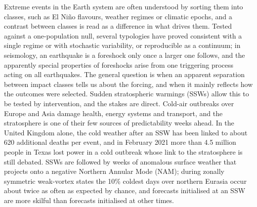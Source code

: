 \documentclass[11pt]{article}
\begin{document}
Extreme events in the Earth system are often understood by sorting them into classes, such as El Niño flavours, weather regimes or climatic epochs, and a contrast between classes is read as a difference in what drives them. Tested against a one-population null, several typologies have proved consistent with a single regime or with stochastic variability\cite{stephenson04,neukom19}, or reproducible as a continuum\cite{thual23}; in seismology, an earthquake is a foreshock only once a larger one follows, and the apparently special properties of foreshocks arise from one triggering process acting on all earthquakes\cite{helmstetter03}. The general question is when an apparent separation between impact classes tells us about the forcing, and when it mainly reflects how the outcomes were selected. Sudden stratospheric warmings (SSWs) allow this to be tested by intervention, and the stakes are direct. Cold-air outbreaks over Europe and Asia damage health, energy systems and transport, and the stratosphere is one of their few sources of predictability weeks ahead\cite{domeisenbutler20}. In the United Kingdom alone, the cold weather after an SSW has been linked to about 620 additional deaths per event\cite{charltonperez21}, and in February 2021 more than 4.5 million people in Texas lost power in a cold outbreak\cite{ferc21} whose link to the stratosphere is still debated\cite{cohen21,davis22}. SSWs are followed by weeks of anomalous surface weather that projects onto a negative Northern Annular Mode (NAM)\cite{baldwin21}; during zonally symmetric weak-vortex states the 10\% coldest days over northern Eurasia occur about twice as often as expected by chance\cite{kretschmer18}, and forecasts initialised at an SSW are more skilful than forecasts initialised at other times\cite{sigmond13}.
\end{document}
